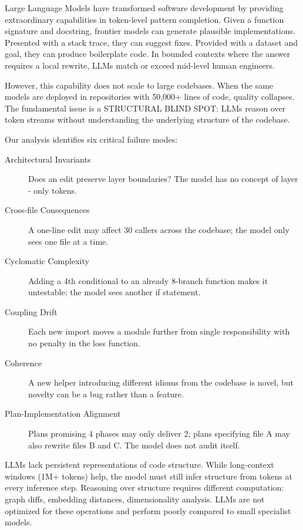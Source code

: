 

Large Language Models have transformed software development by providing extraordinary capabilities in token-level pattern completion. Given a function signature and docstring, frontier models can generate plausible implementations. Presented with a stack trace, they can suggest fixes. Provided with a dataset and goal, they can produce boilerplate code. In bounded contexts where the answer requires a local rewrite, LLMs match or exceed mid-level human engineers.

However, this capability does not scale to large codebases. When the same models are deployed in repositories with 50,000+ lines of code, quality collapses. The fundamental issue is a STRUCTURAL BLIND SPOT: LLMs reason over token streams without understanding the underlying structure of the codebase.


Our analysis identifies six critical failure modes:

\begin{description}
    \item[Architectural Invariants] Does an edit preserve layer boundaries? The model has no concept of layer - only tokens.
    \item[Cross-file Consequences] A one-line edit may affect 30 callers across the codebase; the model only sees one file at a time.
    \item[Cyclomatic Complexity] Adding a 4th conditional to an already 8-branch function makes it untestable; the model sees another if statement.
    \item[Coupling Drift] Each new import moves a module further from single responsibility with no penalty in the loss function.
    \item[Coherence] A new helper introducing different idioms from the codebase is novel, but novelty can be a bug rather than a feature.
    \item[Plan-Implementation Alignment] Plans promising 4 phases may only deliver 2; plans specifying file A may also rewrite files B and C. The model does not audit itself.
\end{description}


LLMs lack persistent representations of code structure. While long-context windows (1M+ tokens) help, the model must still infer structure from tokens at every inference step. Reasoning over structure requires different computation: graph diffs, embedding distances, dimensionality analysis. LLMs are not optimized for these operations and perform poorly compared to small specialist models.

